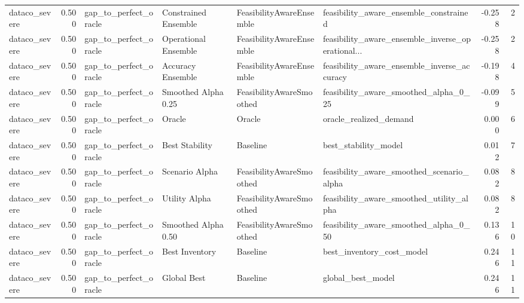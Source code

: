 \begin{table}
{\begin{tabular}{lrllllrr}
 dataco\_severe &             0.500 &       gap\_to\_perfect\_oracle &  Constrained Ensemble &  FeasibilityAwareEnsemble &             feasibility\_aware\_ensemble\_constrained &        -0.258 &               2 \\
 dataco\_severe &             0.500 &       gap\_to\_perfect\_oracle &  Operational Ensemble &  FeasibilityAwareEnsemble &  feasibility\_aware\_ensemble\_inverse\_operational... &        -0.258 &               2 \\
 dataco\_severe &             0.500 &       gap\_to\_perfect\_oracle &     Accuracy Ensemble &  FeasibilityAwareEnsemble &        feasibility\_aware\_ensemble\_inverse\_accuracy &        -0.198 &               4 \\
 dataco\_severe &             0.500 &       gap\_to\_perfect\_oracle &   Smoothed Alpha 0.25 &  FeasibilityAwareSmoothed &              feasibility\_aware\_smoothed\_alpha\_0\_25 &        -0.099 &               5 \\
 dataco\_severe &             0.500 &       gap\_to\_perfect\_oracle &                Oracle &                    Oracle &                             oracle\_realized\_demand &         0.000 &               6 \\
 dataco\_severe &             0.500 &       gap\_to\_perfect\_oracle &        Best Stability &                  Baseline &                               best\_stability\_model &         0.012 &               7 \\
 dataco\_severe &             0.500 &       gap\_to\_perfect\_oracle &        Scenario Alpha &  FeasibilityAwareSmoothed &          feasibility\_aware\_smoothed\_scenario\_alpha &         0.082 &               8 \\
 dataco\_severe &             0.500 &       gap\_to\_perfect\_oracle &         Utility Alpha &  FeasibilityAwareSmoothed &           feasibility\_aware\_smoothed\_utility\_alpha &         0.082 &               8 \\
 dataco\_severe &             0.500 &       gap\_to\_perfect\_oracle &   Smoothed Alpha 0.50 &  FeasibilityAwareSmoothed &              feasibility\_aware\_smoothed\_alpha\_0\_50 &         0.136 &              10 \\
 dataco\_severe &             0.500 &       gap\_to\_perfect\_oracle &        Best Inventory &                  Baseline &                          best\_inventory\_cost\_model &         0.246 &              11 \\
 dataco\_severe &             0.500 &       gap\_to\_perfect\_oracle &           Global Best &                  Baseline &                                  global\_best\_model &         0.246 &              11 \\

\end{tabular}}
\end{table}
